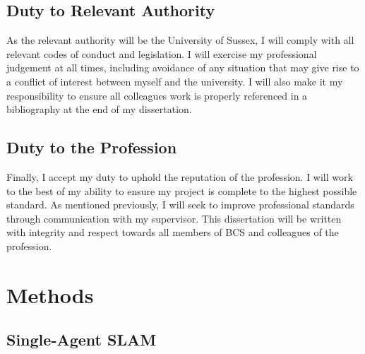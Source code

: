 \documentclass[12pt]{article}
\begin{document}
\subsection{Duty to Relevant Authority}
As the relevant authority will be the University of Sussex, I will comply with all relevant codes of conduct and legislation. I
will exercise my professional judgement at all times, including avoidance of any situation that may give rise to a conflict of
interest between myself and the university. I will also make it my responsibility to ensure all colleagues work is properly
referenced in a bibliography at the end of my dissertation. \\
\subsection{Duty to the Profession}
Finally, I accept my duty to uphold the reputation of the profession. I will work to the best of my ability to ensure my project
is complete to the highest possible standard. As mentioned previously, I will seek to improve professional standards through
communication with my supervisor. This dissertation will be written with integrity and respect towards all members of BCS and colleagues
of the profession. \\



\section{Methods}

\subsection{Single-Agent SLAM}
\end{document}
